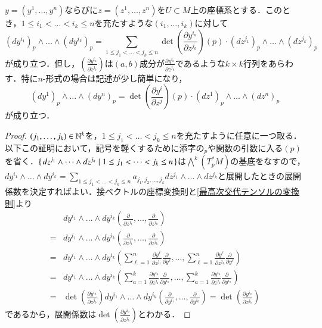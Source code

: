 \begin{prop}
$y=(y^1, \dots, y^n)$ならびに$z = (z^1,\dots, z^n)$を$U \subset M$上の座標系とする．このとき，$1 \leq i_1 < \dots < i_k \leq n$を充たすような$(i_1, \dots, i_k)$に対して
\begin{equation}
\left(dy^{i_1} \right)_p \wedge \dots \wedge \left(dy^{i_k} \right)_p = \sum_{1 \leq j_1 < \dots < j_k \leq n} \det \left( \frac{\partial y^{i_a}}{\partial z^{j_b}} \right) (p) \cdot \left( dz^{j_1} \right)_p \wedge \dots \wedge \left( dz^{j_k} \right)_p
\end{equation}が成り立つ．但し，$\left( \frac{\partial y^{i_a}}{\partial z^{j_b}} \right)$は$(a,b)$成分が$\frac{\partial y^{i_a}}{\partial z^{j_b}}$であるような$k \times k$行列をあらわす．特に$n$-形式の場合は記述が少し簡単になり，
\begin{equation}
\left(dy^1 \right)_p \wedge \dots \wedge \left(dy^n \right)_p = \det \left( \frac{\partial y^i}{\partial z^j} \right) (p) \cdot \left( dz^1 \right)_p \wedge \dots \wedge \left( dz^n \right)_p
\end{equation}が成り立つ．
\end{prop}

\begin{proof}
$(j_1, \dots, j_k) \in \mathbb{N}^k$を，$1 \leq j_1 < \dots < j_k \leq n$を充たすように任意に一つ取る．以下この証明において，記号を軽くするために添字の$_p$や関数の引数に入る$(p)$を省く．$\set{dz^{j_1} \wedge \dots \wedge dz^{j_k} | 1 \leq j_1< \dots < j_k \leq n }$は$\bigwedge^k(T_p^*M)$の基底をなすので，$dy^{i_1} \wedge \dots \wedge dy^{i_k} = \sum_{1 \leq j_1 < \dots < j_k \leq n} a_{j_1, j_2, \dots, j_k} dz^{j_1} \wedge \dots \wedge dz^{j_k}$と展開したときの展開係数を決定すればよい．接ベクトルの座標変換則と\cref{最高次交代テンソルの変換則}より
\begin{align}
& dy^{i_1} \wedge \dots \wedge dy^{i_k} \left( \frac{\partial}{\partial z^{j_1}}, \dots, \frac{\partial}{\partial z^{j_k}} \right) \\
{}=& dy^{i_1} \wedge \dots \wedge dy^{i_k} \left( \frac{\partial}{\partial z^{j_1}}, \dots, \frac{\partial}{\partial z^{j_k}} \right) \\
{}=& dy^{i_1} \wedge \dots \wedge dy^{i_k} \left( \sum_{\ell=1}^n \frac{\partial y^\ell}{\partial z^{j_1}} \frac{\partial}{\partial y^\ell}, \dots, \sum_{\ell=1}^n \frac{\partial y^\ell}{\partial z^{j_k}} \frac{\partial}{\partial y^\ell} \right) \\
{}=& dy^{i_1} \wedge \dots \wedge dy^{i_k} \left( \sum_{a=1}^k \frac{\partial y^{i_a}}{\partial z^{j_1}} \frac{\partial}{\partial y^{i_a}}, \dots, \sum_{a=1}^k \frac{\partial y^{i_a}}{\partial z^{j_k}} \frac{\partial}{\partial y^{i_a}} \right) \\
{}=& \det \left( \frac{\partial y^{i_a}}{\partial z^{j_b}} \right) dy^{i_1} \wedge \dots \wedge dy^{i_k} \left( \frac{\partial}{\partial y^{i_1}}, \dots, \frac{\partial}{\partial y^{i_k}} \right) = \det \left( \frac{\partial y^{i_a}}{\partial z^{j_b}} \right)
\end{align}
であるから，展開係数は$\det \left( \frac{\partial y^{i_a}}{\partial z^{j_b}} \right)$とわかる．
\end{proof}

